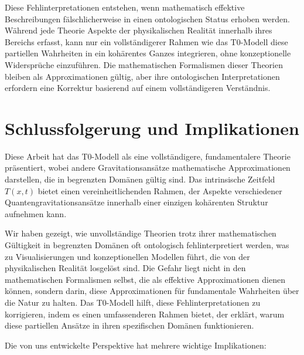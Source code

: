 \documentclass[12pt,a4paper]{article}
\newcommand{\Tfieldt}{T(x,t)}
\begin{document}
	Diese Fehlinterpretationen entstehen, wenn mathematisch effektive Beschreibungen fälschlicherweise in einen ontologischen Status erhoben werden. Während jede Theorie Aspekte der physikalischen Realität innerhalb ihres Bereichs erfasst, kann nur ein vollständigerer Rahmen wie das T0-Modell diese partiellen Wahrheiten in ein kohärentes Ganzes integrieren, ohne konzeptionelle Widersprüche einzuführen. Die mathematischen Formalismen dieser Theorien bleiben als Approximationen gültig, aber ihre ontologischen Interpretationen erfordern eine Korrektur basierend auf einem vollständigeren Verständnis.
	
	\section{Schlussfolgerung und Implikationen}
	\label{sec:conclusion}
	
	Diese Arbeit hat das T0-Modell als eine vollständigere, fundamentalere Theorie präsentiert, wobei andere Gravitationsansätze mathematische Approximationen darstellen, die in begrenzten Domänen gültig sind. Das intrinsische Zeitfeld $\Tfieldt$ bietet einen vereinheitlichenden Rahmen, der Aspekte verschiedener Quantengravitationsansätze innerhalb einer einzigen kohärenten Struktur aufnehmen kann.
	
	Wir haben gezeigt, wie unvollständige Theorien trotz ihrer mathematischen Gültigkeit in begrenzten Domänen oft ontologisch fehlinterpretiert werden, was zu Visualisierungen und konzeptionellen Modellen führt, die von der physikalischen Realität losgelöst sind. Die Gefahr liegt nicht in den mathematischen Formalismen selbst, die als effektive Approximationen dienen können, sondern darin, diese Approximationen für fundamentale Wahrheiten über die Natur zu halten. Das T0-Modell hilft, diese Fehlinterpretationen zu korrigieren, indem es einen umfassenderen Rahmen bietet, der erklärt, warum diese partiellen Ansätze in ihren spezifischen Domänen funktionieren.
	
	Die von uns entwickelte Perspektive hat mehrere wichtige Implikationen:
	
\end{document}
